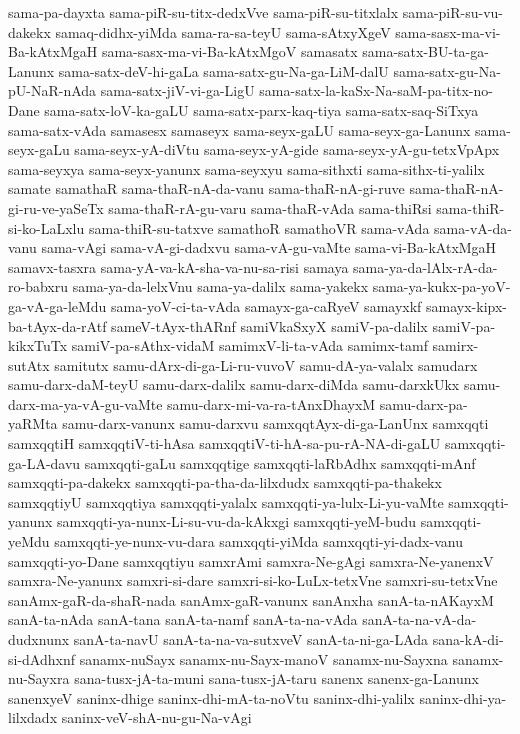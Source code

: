 {sama-pa-dayxta
sama-piR-su-titx-dedxVve
sama-piR-su-titxlalx
sama-piR-su-vu-dakekx
samaq-didhx-yiMda
sama-ra-sa-teyU
sama-sAtxyXgeV
sama-sasx-ma-vi-Ba-kAtxMgaH
sama-sasx-ma-vi-Ba-kAtxMgoV
samasatx
sama-satx-BU-ta-ga-Lanunx
sama-satx-deV-hi-gaLa
sama-satx-gu-Na-ga-LiM-dalU
sama-satx-gu-Na-pU-NaR-nAda
sama-satx-jiV-vi-ga-LigU
sama-satx-la-kaSx-Na-saM-pa-titx-no-Dane
sama-satx-loV-ka-gaLU
sama-satx-parx-kaq-tiya
sama-satx-saq-SiTxya
sama-satx-vAda
samasesx
samaseyx
sama-seyx-gaLU
sama-seyx-ga-Lanunx
sama-seyx-gaLu
sama-seyx-yA-diVtu
sama-seyx-yA-gide
sama-seyx-yA-gu-tetxVpApx
sama-seyxya
sama-seyx-yanunx
sama-seyxyu
sama-sithxti
sama-sithx-ti-yalilx
samate
samathaR
sama-thaR-nA-da-vanu
sama-thaR-nA-gi-ruve
sama-thaR-nA-gi-ru-ve-yaSeTx
sama-thaR-rA-gu-varu
sama-thaR-vAda
sama-thiRsi
sama-thiR-si-ko-LaLxlu
sama-thiR-su-tatxve
samathoR
samathoVR
sama-vAda
sama-vA-da-vanu
sama-vAgi
sama-vA-gi-dadxvu
sama-vA-gu-vaMte
sama-vi-Ba-kAtxMgaH
samavx-tasxra
sama-yA-va-kA-sha-va-nu-sa-risi
samaya
sama-ya-da-lAlx-rA-da-ro-babxru
sama-ya-da-lelxVnu
sama-ya-dalilx
sama-yakekx
sama-ya-kukx-pa-yoV-ga-vA-ga-leMdu
sama-yoV-ci-ta-vAda
samayx-ga-caRyeV
samayxkf
samayx-kipx-ba-tAyx-da-rAtf
sameV-tAyx-thARnf
samiVkaSxyX
samiV-pa-dalilx
samiV-pa-kikxTuTx
samiV-pa-sAthx-vidaM
samimxV-li-ta-vAda
samimx-tamf
samirx-sutAtx
samitutx
samu-dArx-di-ga-Li-ru-vuvoV
samu-dA-ya-valalx
samudarx
samu-darx-daM-teyU
samu-darx-dalilx
samu-darx-diMda
samu-darxkUkx
samu-darx-ma-ya-vA-gu-vaMte
samu-darx-mi-va-ra-tAnxDhayxM
samu-darx-pa-yaRMta
samu-darx-vanunx
samu-darxvu
samxqqtAyx-di-ga-LanUnx
samxqqti
samxqqtiH
samxqqtiV-ti-hAsa
samxqqtiV-ti-hA-sa-pu-rA-NA-di-gaLU
samxqqti-ga-LA-davu
samxqqti-gaLu
samxqqtige
samxqqti-laRbAdhx
samxqqti-mAnf
samxqqti-pa-dakekx
samxqqti-pa-tha-da-lilxdudx
samxqqti-pa-thakekx
samxqqtiyU
samxqqtiya
samxqqti-yalalx
samxqqti-ya-lulx-Li-yu-vaMte
samxqqti-yanunx
samxqqti-ya-nunx-Li-su-vu-da-kAkxgi
samxqqti-yeM-budu
samxqqti-yeMdu
samxqqti-ye-nunx-vu-dara
samxqqti-yiMda
samxqqti-yi-dadx-vanu
samxqqti-yo-Dane
samxqqtiyu
samxrAmi
samxra-Ne-gAgi
samxra-Ne-yanenxV
samxra-Ne-yanunx
samxri-si-dare
samxri-si-ko-LuLx-tetxVne
samxri-su-tetxVne
sanAmx-gaR-da-shaR-nada
sanAmx-gaR-vanunx
sanAnxha
sanA-ta-nAKayxM
sanA-ta-nAda
sanA-tana
sanA-ta-namf
sanA-ta-na-vAda
sanA-ta-na-vA-da-dudxnunx
sanA-ta-navU
sanA-ta-na-va-sutxveV
sanA-ta-ni-ga-LAda
sana-kA-di-si-dAdhxnf
sanamx-nuSayx
sanamx-nu-Sayx-manoV
sanamx-nu-Sayxna
sanamx-nu-Sayxra
sana-tusx-jA-ta-muni
sana-tusx-jA-taru
sanenx
sanenx-ga-Lanunx
sanenxyeV
saninx-dhige
saninx-dhi-mA-ta-noVtu
saninx-dhi-yalilx
saninx-dhi-ya-lilxdadx
saninx-veV-shA-nu-gu-Na-vAgi
}
